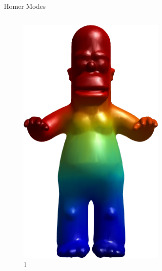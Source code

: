 \documentclass{beamer}
\begin{document}
\begin{frame}{Homer Modes}
\begin{columns}
\begin{column}[T]{3cm}
\begin{figure}[t]
    \includegraphics[width=\textwidth]{Harmonics/HomerModes/1.png}
    \caption*{\huge 1}
\end{figure}
\end{column}
\begin{column}[T]{3cm}
\begin{figure}[t]

\end{figure}
\end{column}
\end{columns}
\end{frame}
\end{document}
